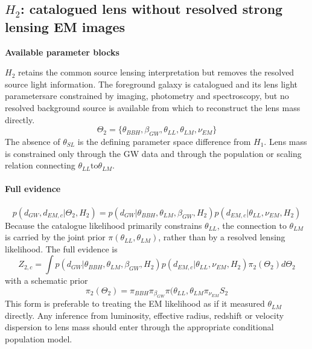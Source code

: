 \documentclass[pdflatex,sn-mathphys-num]{sn-jnl}%
\theoremstyle{thmstyleone}%
\theoremstyle{thmstyletwo}%
\theoremstyle{thmstylethree}%
\begin{document}

\begin{appendices}

\section{$H_2$: catalogued lens without resolved strong lensing EM images}

\textbf{Available parameter blocks}

$H_2$ retains the common source lensing interpretation but removes the resolved source light information.
The foreground galaxy is catalogued and its lens light parametersare constrained by imaging, photometry and spectroscopy, but no resolved background source is available from which to reconstruct the lens mass directly.
\begin{equation}
\Theta_2 = \{\theta_{BBH},\beta_{GW},\theta_{LL},\theta_{LM},\nu_{EM}\}
\end{equation}
The absence of $\theta_{SL}$ is the defining parameter space difference from $H_1$.
Lens mass is constrained only through the GW data and through the population or scaling relation connecting $\theta_{LL} \text{to} \theta_{LM}$.\\
\\
\textbf{Full evidence}\\
\\
\begin{equation}
p(d_{GW},d_{EM,c}|\Theta_2,H_2) = p(d_{GW}|\theta_{BBH},\theta_{LM},\beta_{GW},H_2)p(d_{EM,c}|\theta_{LL},\nu_{EM},H_2)
\end{equation}	
Because the catalogue likelihood primarily constrains $\theta_{LL}$, the connection to $\theta_{LM}$ is carried by the joint prior $\pi(\theta_{LL},\theta_{LM})$, rather than by a resolved lensing likelihood.
The full evidence is
\begin{equation}
\label{H2evidence}
Z_{2,c} = \int p(d_{GW}|\theta_{BBH},\theta_{LM},\beta_{GW},H_2)p(d_{EM,c}|\theta_{LL},\nu_{EM},H_2)\pi_2(\Theta_2)d\Theta_2
\end{equation}
with a schematic prior
\begin{equation}
\pi_2(\Theta_2) = \pi_{BBH}\pi_{\beta_{GW}}\pi(\theta_{LL},\theta_{LM}\pi_{\nu_{EM}}S_2
\end{equation}
This form is preferable to treating the EM likelihood as if it measured $\theta_{LM}$ directly.
Any inference from luminosity, effective radius, redshift or velocity dispersion to lens mass should enter through the appropriate conditional population model.\\

\end{appendices}
\end{document}
